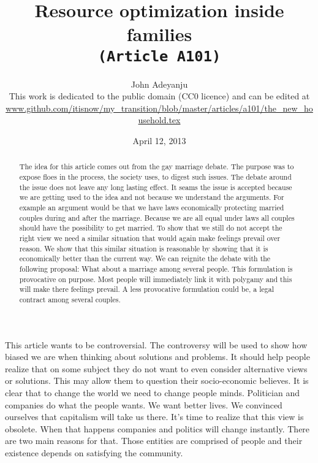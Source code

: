 \documentclass{article}
\begin{document}
\title{Resource optimization inside families \\\tt{\small{(Article A101)}}\\\tt{\small{}}}%
\author{John Adeyanju\\\small{This work is dedicated to the public domain (CC0 licence) and can be edited at}\\ \scriptsize{\url{www.github.com/itisnow/my_transition/blob/master/articles/a101/the_new_household.tex}}}
\date{April 12, 2013}

\maketitle

\begin{abstract}
The idea for this article comes out from the gay marriage debate.
The purpose was to expose floes in the process, the society uses, to digest such issues.
The debate around the issue does not leave any long lasting effect.
It seams the issue is accepted because we are getting used to the idea and not because we understand the arguments.
For example an argument would be that we have laws economically protecting married couples during and after the marriage.
Because we are all equal under laws all couples should have the possibility to get married.
To show that we still do not accept the right view we need a similar situation that would again make feelings prevail over reason.
We show that this similar situation is reasonable by showing that it is economically better than the current way.
We can reignite the debate with the following proposal: What about a marriage among several people.
This formulation is provocative on purpose.
Most people will immediately link it with polygamy and this will make there feelings prevail.
A less provocative formulation could be, a legal contract among several couples.
\end{abstract}

This article wants to be controversial.
The controversy will be used to show how biased we are when thinking about solutions and problems.
It should help people realize that on some subject they do not want to even consider alternative views or solutions.
This may allow them to question their socio-economic believes.
It is clear that to change the world we need to change people minds.
Politician and companies do what the people wants.
We want better lives.
We convinced ourselves that capitalism will take us there.
It's time to realize that this view is obsolete.
When that happens companies and politics will change instantly.
There are two main reasons for that.
Those entities are comprised of people and their existence depends on satisfying the community.
\end{document}

